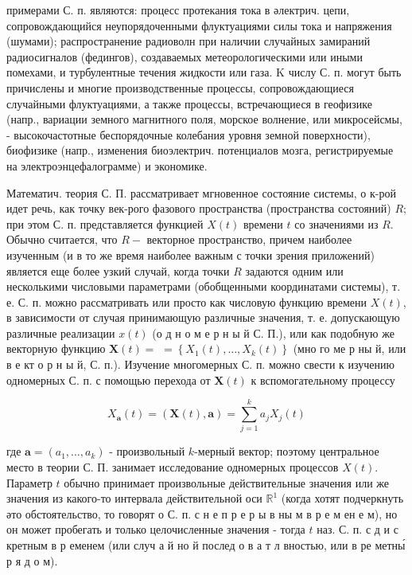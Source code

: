 \documentclass[10pt]{article}
\begin{document}
примерами С. п. являются: процесс протекания тока в әлектрич. цепи, сопровождающийся неупорядоченными флуктуациями силы тока и напряжения (шумами); распространение радиоволн при наличии случайных замираний радиосигналов (федингов), создаваемых метеорологическими или иными помехами, и турбулентные течения жидкости или газа. K числу С. п. могут быть причислены и многие производственные процессы, сопровождающиеся случайными флуктуациями, а также процессы, встречающиеся в геофизике (напр., вариации земного магнитного поля, морское волнение, или микросейсмы, - высокочастотные беспорядочные колебания уровня земной поверхности), биофизике (напр., изменения биоэлектрич. потенциалов мозга, регистрируемые на электроэнцефалограмме) и экономике.



Математич. теория С. П. рассматривает мгновенное состояние системы, о к-рой идет речь, как точку век-рого фазового пространства (пространства состояний) $R$; при этом С. п. представляется функцией $X(t)$ времени $t$ со значениями из $R$. Обычно считается, что $R-$ векторное пространство, причем наиболее изученным (и в то же время наиболее важным с точки зрения приложений) является еще более узкий случай, когда точки $R$ задаются одним или несколькими числовыми параметрами (обобщенными координатами системы), т. е. С. п. можно рассматривать или просто как числовую функцию времени $X(t)$, в зависимости от случая принимающую различные значения, т. е. допускающую различные реализации $x(t)$ (о д н о м е р н ы й С. П.), или как подобную же векторную функцию $\boldsymbol{X}(t)=$ $=\left\{X_{1}(t), \ldots, X_{k}(t)\right\}$ (мно го ме р ны й, или в е кт о р н ы й, С. п.). Изучение многомерных С. п. можно свести к изучению одномерных С. п. с помощью перехода от $\boldsymbol{X}(t)$ к вспомогательному процессу



\[

X_{\boldsymbol{a}}(t)=(\boldsymbol{X}(t), \boldsymbol{a})=\sum_{j=1}^{k} a_{j} X_{j}(t)

\]



где $\boldsymbol{a}=\left(a_{1}, \ldots, a_{k}\right)$ - произвольный $k$-мерный вектор; поэтому центральное место в теории С. П. занимает исследование одномерных процессов $X(t)$. Параметр $t$ обычно принимает произвольные действительные значения или же значения из какого-то интервала действительной оси $\mathbb{R}^{1}$ (когда хотят подчеркнуть әто обстоятельство, то говорят о С. п. с н е п р е р ы в ны м в р е м ен е м), но он может пробегать и только целочисленные значения - тогда $t$ наз. С. п. с д и с кретным в р еменем (или случ а й но й послед о в а т л вностью, или в ре метны́ р я д о м).
\end{document}
